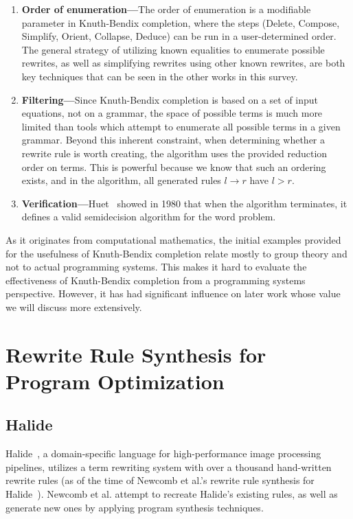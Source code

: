 \documentclass[acmsmall,screen,nonacm]{acmart}
\begin{document}
\begin{enumerate}
    \item \textbf{Order of enumeration---}The order of enumeration is a modifiable parameter in Knuth-Bendix completion, where the steps (Delete, Compose, Simplify, Orient, Collapse, Deduce) can be run in a user-determined order. The general strategy of utilizing known equalities to enumerate possible rewrites, as well as simplifying rewrites using other known rewrites, are both key techniques that can be seen in the other works in this survey.
    \item \textbf{Filtering---}Since Knuth-Bendix completion is based on a set of input equations, not on a grammar, the space of possible terms is much more limited than tools which attempt to enumerate all possible terms in a given grammar. Beyond this inherent constraint, when determining whether a rewrite rule is worth creating, the algorithm uses the provided reduction order on terms. This is powerful because we know that such an ordering exists, and in the algorithm, all generated rules $l \rightarrow r$ have $l>r$.
    \item \textbf{Verification---}Huet~\cite{huet1980complete} showed in 1980 that when the algorithm terminates, it defines a valid semidecision algorithm for the word problem.
\end{enumerate}

As it originates from computational mathematics, the initial examples provided for the usefulness of Knuth-Bendix completion relate mostly to group theory and not to actual programming systems. This makes it hard to evaluate the effectiveness of Knuth-Bendix completion from a programming systems perspective. However, it has had significant influence on later work whose value we will discuss more extensively.

\section{Rewrite Rule Synthesis for Program Optimization}

\subsection{Halide}
Halide~\cite{jrk2013halide}, a domain-specific language for high-performance image processing pipelines, utilizes a term rewriting system with over a thousand hand-written rewrite rules (as of the time of Newcomb et al.'s rewrite rule synthesis for Halide~\cite{newcomb2020verifyinghalide}). Newcomb et al. attempt to recreate Halide's existing rules, as well as generate new ones by applying program synthesis techniques.
\end{document}
